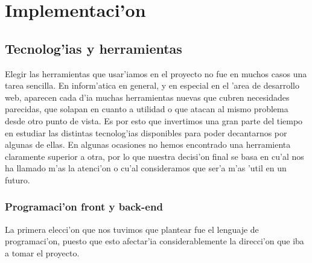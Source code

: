 \section{Implementaci'on}
\label{sec:implementacion}



\subsection{Tecnolog'ias y herramientas}
\label{sec:tecnologias_y_herramientas}

Elegir las herramientas que usar'iamos en el proyecto no fue en muchos casos una tarea sencilla. En inform'atica en general,
y en especial en el 'area de desarrollo web, aparecen cada d'ia muchas herramientas nuevas que cubren necesidades parecidas,
que solapan en cuanto a utilidad o que atacan al mismo problema desde otro punto de vista. Es por esto que
invertimos una gran parte del tiempo en estudiar las distintas tecnolog'ias disponibles para poder decantarnos por algunas
de ellas. En algunas ocasiones no hemos encontrado una herramienta claramente superior a otra, por lo que nuestra decisi'on
final se basa en cu'al nos ha llamado m'as la atenci'on o cu'al consideramos que ser'a m'as 'util en un futuro.

\subsubsection{Programaci'on front y back-end}
\label{sub:programacion_front_y_back_end}

La primera elecci'on que nos tuvimos que plantear fue el lenguaje de programaci'on, puesto que esto afectar'ia considerablemente
la direcci'on que iba a tomar el proyecto. 


